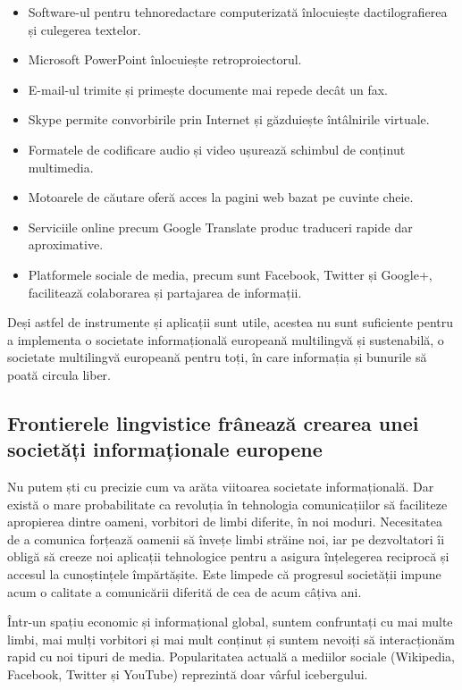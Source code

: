 \documentclass[]{../../metanetpaper}
\begin{document}
\begin{multicols}{2}
\begin{itemize}
\item Software-ul pentru tehnoredactare computerizată înlocuiește dactilografierea și culegerea textelor.
\item Microsoft PowerPoint înlocuiește retroproiectorul.
\item E-mail-ul trimite și primește documente mai repede decât un fax.
\item Skype permite convorbirile prin Internet și găzduiește întâlnirile virtuale.
\item Formatele de codificare audio și video ușurează schimbul de conținut multimedia.
\item Motoarele de căutare oferă acces la pagini web bazat pe cuvinte cheie.
\item Serviciile online precum Google Translate produc traduceri rapide dar aproximative.
\item Platformele sociale de media, precum sunt Facebook, Twitter și Google+, facilitează colaborarea și partajarea de informații.
\end{itemize}

Deși astfel de instrumente și aplicații sunt utile, acestea nu sunt suficiente pentru a implementa o societate informațională europeană multilingvă și sustenabilă, o societate multilingvă europeană pentru toți, în care informația și bunurile să poată circula liber.

\subsection{Frontierele lingvistice frânează crearea unei societăți informaționale europene}

Nu putem ști cu precizie cum va arăta viitoarea societate informațională. Dar există o mare probabilitate ca revoluția în tehnologia comunicațiilor să faciliteze apropierea dintre oameni, vorbitori de limbi diferite, în noi moduri. Necesitatea de a comunica forțează oamenii să învețe limbi străine noi, iar pe dezvoltatori îi obligă să creeze noi aplicații tehnologice pentru a asigura înțelegerea reciprocă și accesul la cunoștințele împărtășite. Este limpede că progresul societății impune acum o calitate a comunicării diferită de cea de acum câțiva ani. 


Într-un spațiu economic și informațional global, suntem confruntați cu mai multe limbi, mai mulți vorbitori și mai mult conținut și suntem nevoiți să interacționăm rapid cu noi tipuri de media. Popularitatea actuală a mediilor sociale (Wikipedia, Facebook, Twitter și YouTube) reprezintă doar vârful icebergului.


\end{multicols}
\end{document}
